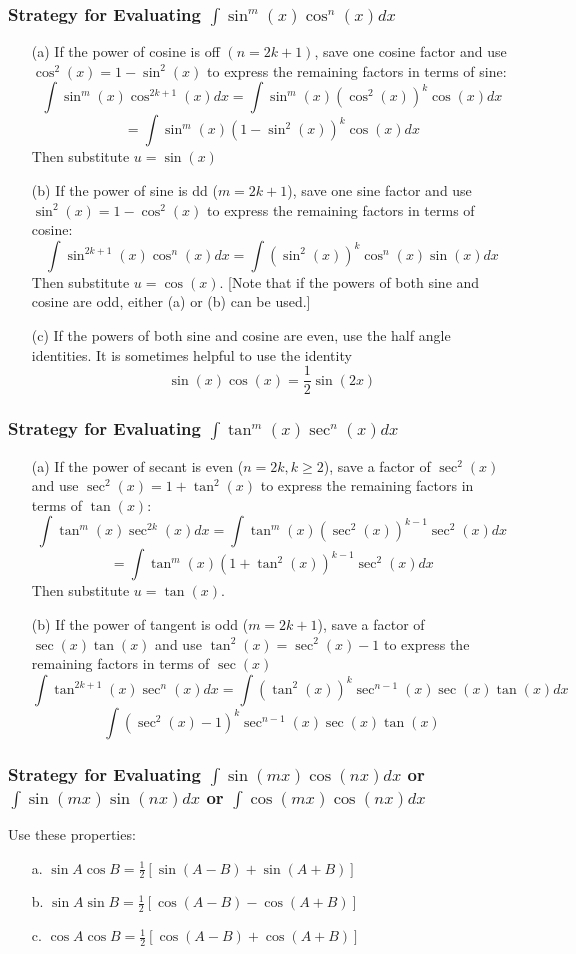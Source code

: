 \documentclass[10pt]{report}
\begin{document}
\subsubsection{Strategy for Evaluating $\int\sin^m(x)\cos^n(x)dx$}
\begin{itemize}
\item[(a)]If the power of cosine is off $(n=2k+1)$, save one cosine factor and use $\cos^2(x)=1-\sin^2(x)$ to express the remaining factors in terms of sine:
$$\int\sin^m(x)\cos^{2k+1}(x)dx=\int\sin^m(x)(\cos^2(x))^k\cos(x)dx$$
$$=\int\sin^m(x)(1-\sin^2(x))^k\cos(x)dx$$
Then substitute $u=\sin(x)$
\item[(b)] If the power of sine is dd ($m=2k+1$), save one sine factor and use $\sin^2(x)=1 - \cos^2(x)$ to express the remaining factors in terms of cosine:
$$\int \sin^{2k+1}(x)\cos^n(x)dx = \int (\sin^2(x))^k\cos^n(x)\sin(x)dx$$
Then substitute $u=\cos(x)$. [Note that if the powers of both sine and cosine are odd, either (a) or (b) can be used.]
\item[(c)] If the powers of both sine and cosine are even, use the half angle identities. It is sometimes helpful to use the identity
$$\sin(x)\cos(x) = \frac{1}{2}\sin(2x)$$
\end{itemize}
\subsubsection{Strategy for Evaluating $\int\tan^m(x)\sec^n(x)dx$}
\begin{itemize}
\item[(a)] If the power of secant is even ($n=2k, k\geq 2$), save a factor of $\sec^2(x)$ and use $\sec^2(x) = 1 + \tan^2(x)$ to express the remaining factors in terms of $\tan(x)$:
$$\int \tan^m(x)\sec^{2k}(x)dx = \int \tan^m(x)(\sec^2(x))^{k-1}\sec^2(x)dx$$
$$=\int \tan^m(x)(1+\tan^2(x))^{k-1}\sec^2(x)dx$$
Then substitute $u=\tan(x)$.
\item[(b)]If the power of tangent is odd ($m=2k+1$), save a factor of $\sec(x)\tan(x)$ and use $\tan^2(x)=\sec^2(x)-1$ to express the remaining factors in terms of $\sec(x)$
$$\int \tan^{2k+1}(x)\sec^n(x)dx = \int (\tan^2(x))^k\sec^{n-1}(x)\sec(x)\tan(x)dx$$
$$\int (\sec^2(x)-1)^k\sec^{n-1}(x)\sec(x)\tan(x)$$
\end{itemize}
\subsubsection{Strategy for Evaluating $\int\sin(mx)\cos(nx)dx$ or $\int\sin(mx)\sin(nx)dx$ or $\int\cos(mx)\cos(nx)dx$}
Use these properties:
\begin{itemize}
\item[a.] $\sin A\cos B = \frac{1}{2}[\sin(A-B)+\sin(A+B)]$
\item[b.] $\sin A\sin B = \frac{1}{2}[\cos(A-B)-\cos(A+B)]$
\item[c.] $\cos A\cos B = \frac{1}{2}[\cos(A-B)+\cos(A+B)]$
\end{itemize}
\end{document}
